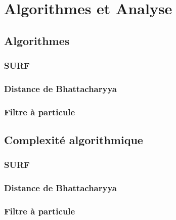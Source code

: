\chapter{Algorithmes et Analyse}

\section{Algorithmes}

\subsection{SURF}

\subsection{Distance de Bhattacharyya}

\subsection{Filtre à particule}

\section{Complexité algorithmique}

\subsection{SURF}

\subsection{Distance de Bhattacharyya}

\subsection{Filtre à particule}

\clearpage